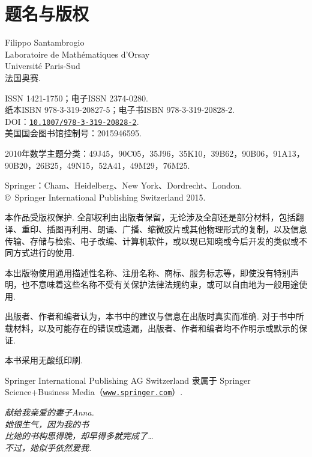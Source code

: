 \section*{题名与版权}
\noindent Filippo Santambrogio\\Laboratoire de Mathématiques d'Orsay\\Université Paris-Sud\\法国奥赛.
\vspace{1em}

\noindent ISSN 1421-1750；电子ISSN 2374-0280.\\
纸本ISBN 978-3-319-20827-5；电子书ISBN 978-3-319-20828-2.\\
DOI：\href{https://doi.org/10.1007/978-3-319-20828-2}{\nolinkurl{10.1007/978-3-319-20828-2}}.\\
美国国会图书馆控制号：2015946595.

\noindent 2010年数学主题分类：49J45，90C05，35J96，35K10，39B62，90B06，91A13，90B20，26B25，49N15，52A41，49M29，76M25.

\noindent Springer：Cham、Heidelberg、New York、Dordrecht、London.\\
\copyright\ Springer International Publishing Switzerland 2015.

本作品受版权保护. 全部权利由出版者保留，无论涉及全部还是部分材料，包括翻译、重印、插图再利用、朗诵、广播、缩微胶片或其他物理形式的复制，以及信息传输、存储与检索、电子改编、计算机软件，或以现已知晓或今后开发的类似或不同方式进行的使用.

本出版物使用通用描述性名称、注册名称、商标、服务标志等，即使没有特别声明，也不意味着这些名称不受有关保护法律法规约束，或可以自由地为一般用途使用.

出版者、作者和编者认为，本书中的建议与信息在出版时真实而准确. 对于书中所载材料，以及可能存在的错误或遗漏，出版者、作者和编者均不作明示或默示的保证.

本书采用无酸纸印刷.

Springer International Publishing AG Switzerland 隶属于 Springer Science+Business Media（\href{https://www.springer.com}{\nolinkurl{www.springer.com}}）.
\clearpage
\thispagestyle{plain}\vspace*{.25\textheight}
\begin{flushright}\itshape
献给我亲爱的妻子Anna.\\
她很生气，因为我的书\\
比她的书构思得晚，却早得多就完成了\ldots\\
不过，她似乎依然爱我.
\end{flushright}\clearpage
